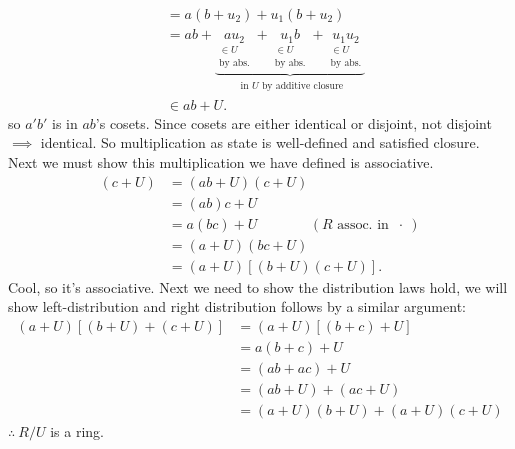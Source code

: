 \begin{lemma}
\begin{enumerate}[label=\roman*)]
\begin{align}
        &= a(b+u_2)+u_1(b+u_2) \nonumber \\
        &= ab+\underbrace{\underset{\substack{\in U \\ \text{by abs.}}}{au_2} + \underset{\substack{\in U \\ \text{by abs.}}}{u_1b} + \underset{\substack{\in U \\ \text{by abs.}}}{u_1u_2}}_{\substack{\text{ in }U\text{ by additive closure}}} \nonumber \\
        &\in ab + U . \nonumber
    \end{align}
    so $a'b'$ is in $ab$'s cosets. Since cosets are either identical or disjoint, not disjoint
    $\implies$ identical. So multiplication as state is well-defined and satisfied closure. Next we
    must show this multiplication we have defined is associative.
    \begin{align}
        [(a+u)(b+U)](c+U) &= (ab+U)(c+U) \nonumber \\
        &= (ab)c + U \nonumber \\
        &= a(bc)+ U  \ \ \ \ \ \ \ \ \ \ \ \ \ \ \ \ \ (R \text{ assoc. in } \ \cdot \ )\nonumber \\
        &= (a+U)(bc+U) \nonumber \\
        &= (a+U)[(b+U)(c+U)]. \nonumber
    \end{align}
    Cool, so it's associative. Next we need to show the distribution laws hold, we will show
    left-distribution and right distribution follows by a similar argument:
    \begin{align}
        (a+U)[(b+U)+(c+U)] &= (a+U)[(b+c)+U] \nonumber \\
        &= a(b+c) +U \nonumber \\
        &= (ab+ac)+U \nonumber \\
        &= (ab+U)+(ac+U) \nonumber \\
        &= (a+U)(b+U) + (a+U)(c+U) \nonumber
    \end{align}
    $\therefore \  R/U$ is a ring. \steezybreak


\end{enumerate}
\end{lemma}
